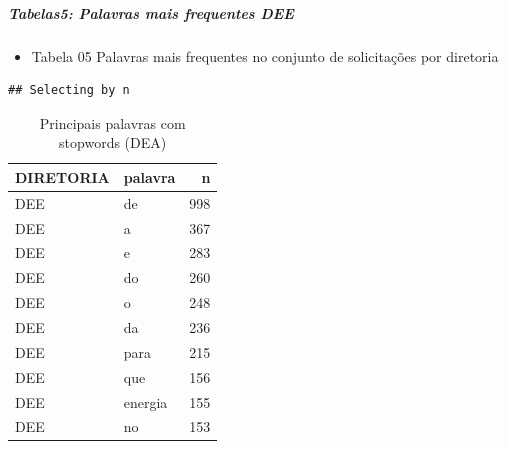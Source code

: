 \documentclass[]{article}
\newenvironment{Shaded}{\begin{snugshade}}{\end{snugshade}}
\newcommand{\KeywordTok}[1]{\textcolor[rgb]{0.13,0.29,0.53}{\textbf{#1}}}
\newcommand{\DataTypeTok}[1]{\textcolor[rgb]{0.13,0.29,0.53}{#1}}
\newcommand{\DecValTok}[1]{\textcolor[rgb]{0.00,0.00,0.81}{#1}}
\newcommand{\StringTok}[1]{\textcolor[rgb]{0.31,0.60,0.02}{#1}}
\newcommand{\OperatorTok}[1]{\textcolor[rgb]{0.81,0.36,0.00}{\textbf{#1}}}
\newcommand{\NormalTok}[1]{#1}
\providecommand{\tightlist}{%
  \setlength{\itemsep}{0pt}\setlength{\parskip}{0pt}}
\let\oldsubparagraph\subparagraph
\renewcommand{\subparagraph}[1]{\oldsubparagraph{#1}\mbox{}}
\begin{document}
\subparagraph{Tabelas5: Palavras mais frequentes
DEE}\label{tabelas5-palavras-mais-frequentes-dee}

\begin{itemize}
\tightlist
\item
  Tabela 05 Palavras mais frequentes no conjunto de solicitações por
  diretoria
\end{itemize}

\begin{Shaded}
\end{Shaded}

\begin{verbatim}
## Selecting by n
\end{verbatim}

\begin{table}[!h]

\caption{\label{tab:unnamed-chunk-25}Principais palavras com stopwords (DEA)}
\centering
\begin{tabular}{llr}
\toprule
DIRETORIA & palavra & n\\
\midrule
\rowcolor{gray!6}  DEE & de & 998\\
DEE & a & 367\\
\rowcolor{gray!6}  DEE & e & 283\\
DEE & do & 260\\
\rowcolor{gray!6}  DEE & o & 248\\
\addlinespace
DEE & da & 236\\
\rowcolor{gray!6}  DEE & para & 215\\
DEE & que & 156\\
\rowcolor{gray!6}  DEE & energia & 155\\
DEE & no & 153\\
\bottomrule
\end{tabular}
\end{table}
\end{document}
